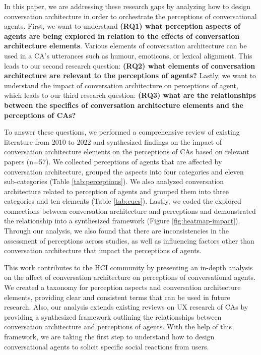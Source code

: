 \documentclass[sigconf,screen,review, anonymous]{acmart}
\begin{document}

In this paper, we are addressing these research gaps by analyzing how to design conversation architecture in order to orchestrate the perceptions of conversational agents. First, we want to understand \textbf{(RQ1) what perception aspects of agents are being explored in relation to the effects of conversation architecture elements}. Various elements of conversation architecture can be used in a CA's utterances such as humour, emoticons, or lexical alignment. This leads to our second research question: \textbf{(RQ2) what elements of conversation architecture are relevant to the perceptions of agents?} Lastly, we want to understand the impact of conversation architecture on perceptions of agent, which leads to our third research question: \textbf{(RQ3) what are the relationships between the specifics of conversation architecture elements and the perceptions of CAs?}

To answer these questions, we performed a comprehensive review of existing literature from 2010 to 2022 and synthesized findings on the impact of conversation architecture elements on the perceptions of CAs based on relevant papers (n=57). We collected perceptions of agents that are affected by conversation architecture,  grouped the aspects into four categories and eleven sub-categories (Table \ref{tab:perceptions}). We also analyzed conversation architecture related to perception of agents and grouped them into three categories and ten elements (Table \ref{tab:cues}). Lastly, we coded the explored connections between conversation architecture and perceptions and demonstrated the relationship into a synthesized framework (Figure \ref{fig:heatmap-impact}). Through our analysis, we also found that there are inconsistencies in the assessment of perceptions across studies, as well as influencing factors other than conversation architecture that impact the perceptions of agents.

This work contributes to the HCI community by presenting an in-depth analysis on the affect of conversation architecture on perceptions of conversational agents. We created a taxonomy for perception aspects and conversation architecture elements, providing clear and consistent terms that can be used in future research. Also, our analysis extends existing reviews on UX research of CAs \cite{clark2019state}\cite{rapp2021human}\cite{zheng2022ux} by providing a synthesized framework outlining the relationships between conversation architecture and perceptions of agents. With the help of this framework, we are taking the first step to understand how to design conversational agents to solicit specific social reactions from users.
\end{document}
